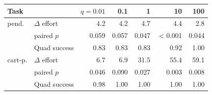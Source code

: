 \begin{tabular}{llrrrrr}\toprule
Task & & $q{=}0.01$ & 0.1 & 1 & 10 & 100 \\\midrule
pend. & $\Delta$ effort & 4.2 & 4.2 & 4.7 & 4.4 & 2.8 \\
 & paired $p$ & 0.059 & 0.057 & 0.047 & $<$0.001 & 0.044 \\
 & Quad success & 0.83 & 0.83 & 0.83 & 0.92 & 1.00 \\
cart-p. & $\Delta$ effort & 6.7 & 6.9 & 31.5 & 55.4 & 59.1 \\
 & paired $p$ & 0.046 & 0.090 & 0.027 & 0.003 & 0.008 \\
 & Quad success & 0.98 & 1.00 & 1.00 & 1.00 & 1.00 \\
\bottomrule
\end{tabular}
